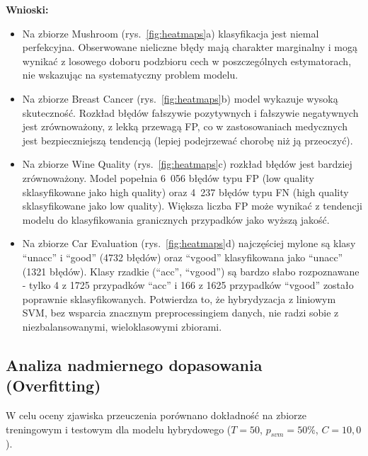 \documentclass[a4paper,11pt]{article}
\begin{document}
\textbf{Wnioski:}
\begin{itemize}
    \item Na zbiorze Mushroom (rys.~\ref{fig:heatmaps}a) klasyfikacja jest niemal perfekcyjna. Obserwowane nieliczne błędy mają charakter marginalny i mogą wynikać z losowego doboru podzbioru cech w poszczególnych estymatorach, nie wskazując na systematyczny problem modelu.
    \item Na zbiorze Breast Cancer (rys.~\ref{fig:heatmaps}b) model wykazuje wysoką skuteczność. Rozkład błędów fałszywie pozytywnych i fałszywie negatywnych jest zrównoważony, z lekką przewagą FP, co w zastosowaniach medycznych jest bezpieczniejszą tendencją (lepiej podejrzewać chorobę niż ją przeoczyć).
    \item Na zbiorze Wine Quality (rys.~\ref{fig:heatmaps}c) rozkład błędów jest bardziej zrównoważony. Model popełnia 6~056 błędów typu FP (low quality sklasyfikowane jako high quality) oraz 4~237 błędów typu FN (high quality sklasyfikowane jako low quality). Większa liczba FP może wynikać z tendencji modelu do klasyfikowania granicznych przypadków jako wyższą jakość.
    \item Na zbiorze Car Evaluation (rys.~\ref{fig:heatmaps}d) najczęściej mylone są klasy ``unacc'' i ``good'' (4732 błędów) oraz ``vgood'' klasyfikowana jako ``unacc'' (1321 błędów). Klasy rzadkie (``acc'', ``vgood'') są bardzo słabo rozpoznawane - tylko 4 z 1725 przypadków ``acc'' i 166 z 1625 przypadków ``vgood'' zostało poprawnie sklasyfikowanych. Potwierdza to, że hybrydyzacja z liniowym SVM, bez wsparcia znacznym preprocessingiem danych, nie radzi sobie z niezbalansowanymi, wieloklasowymi zbiorami.
\end{itemize}

\subsection{Analiza nadmiernego dopasowania (Overfitting)}
W celu oceny zjawiska przeuczenia porównano dokładność na zbiorze treningowym i testowym dla modelu hybrydowego ($T=50$, $p_{svm}=50\%$, $C=10{,}0$).
\end{document}
